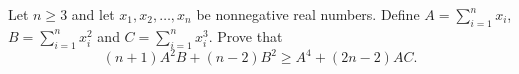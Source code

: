 \documentclass{article}
\begin{document}
\setlength{\parindent}{0pt}
Let \( n \geq 3 \) and let \( x_1, x_2, \dots, x_n \) be nonnegative real numbers. Define \( A = \displaystyle\sum_{i=1}^{n} x_i \), \( B = \displaystyle\sum_{i=1}^{n} x_i^2 \) and \( {C = \displaystyle\sum_{i=1}^{n} x_i^3} \).
Prove that
\[
(n+1)A^2B + (n-2)B^2 \geq A^4 + (2n-2)AC.
\]
\end{document}
